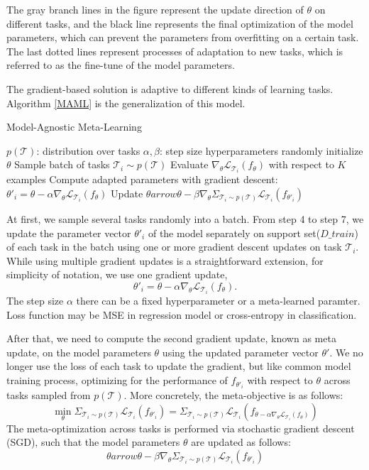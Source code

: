The gray branch lines in the figure represent the update direction of $\theta$ on different tasks, and the black line represents the final optimization of the model parameters, which can prevent the parameters from overfitting on a certain task. The last dotted lines represent processes of adaptation to new tasks, which is referred to as the fine-tune of the model parameters.

The gradient-based solution is adaptive to different kinds of learning tasks. Algorithm \ref{MAML} is the generalization of this model.



\begin{algorithm}[h]
  \caption{Model-Agnostic Meta-Learning}
  \label{MAML}
  \begin{algorithmic}[1]
    \REQUIRE $p(\mathcal{T})$: distribution over tasks
    \REQUIRE $\alpha, \beta$: step size hyperparameters
    \STATE randomly initialize $\theta$
    \STATE Sample batch of tasks $\mathcal{T}_i \sim p(\mathcal{T})$
    \STATE Evaluate $\nabla_\theta \mathcal{L}_{\mathcal{T}_i} (f_\theta)$ with respect to $K$ examples
    \STATE Compute adapted parameters with gradient descent: $\theta'_i = \theta - \alpha\nabla_\theta \mathcal{L}_{\mathcal{T}_i} (f_\theta)$
    \ENDFOR
    \STATE Update $\theta arrow \theta - \beta\nabla_\theta \Sigma_{\mathcal{T}_i \sim p(\mathcal{T})}\mathcal{L}_{\mathcal{T}_i} (f_{\theta'_i})$
    \ENDWHILE
  \end{algorithmic}
\end{algorithm}

At first, we sample several tasks randomly into a batch. From step 4 to step 7, we update the parameter vector $\theta'_i$ of the model separately on support set($D\_train$) of each task in the batch using one or more gradient descent updates on task $\mathcal{T}_i$.
While using multiple gradient updates is a straightforward extension, for simplicity of notation, we use one gradient update,
$$\theta'_i = \theta - \alpha\nabla_\theta \mathcal{L}_{\mathcal{T}_i} (f_\theta).$$
The step size $\alpha$ there can be a fixed hyperparameter or a meta-learned paramter. Loss function may be MSE in regression model or cross-entropy in classification.

After that, we need to compute the second gradient update, known as meta update, on the model parameters $\theta$ using the updated parameter vector $\theta'$. We no longer use the loss of each task to update the gradient, but like common model training process, optimizing for the performance of $f_{\theta'_i}$ with respect to $\theta$ across tasks sampled from
$p(\mathcal{T})$. More concretely, the meta-objective is as follows:
$$\min_\theta \Sigma_{\mathcal{T}_i \sim p(\mathcal{T})}\mathcal{L}_{\mathcal{T}_i} (f_{\theta'_i}) = \Sigma_{\mathcal{T}_i \sim p(\mathcal{T})}\mathcal{L}_{\mathcal{T}_i} (f_{\theta - \alpha\nabla_\theta \mathcal{L}_{\mathcal{T}_i} (f_\theta)})$$
The meta-optimization across tasks is performed via
stochastic gradient descent (SGD), such that the model parameters $\theta$ are updated as follows:
$$\theta arrow \theta - \beta\nabla_\theta \Sigma_{\mathcal{T}_i \sim p(\mathcal{T})}\mathcal{L}_{\mathcal{T}_i} (f_{\theta'_i})$$

